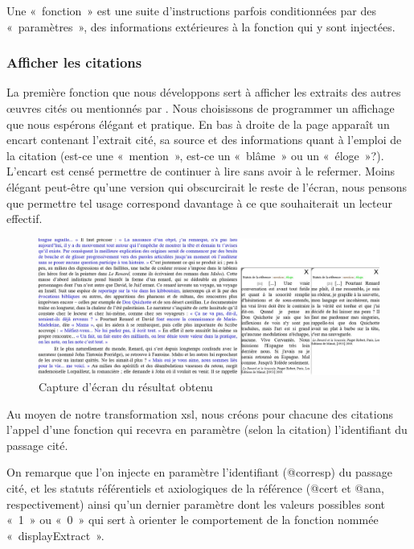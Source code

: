 \documentclass[12pt, a4paper]{article}
\begin{document}
Une «~fonction~» est une suite d'instructions parfois conditionnées par des «~paramètres~», des informations extérieures à la fonction qui y sont injectées.

\subsubsection{Afficher les citations}
\label{quote_dis}


La première fonction que nous développons sert à afficher les extraits des autres œuvres cités ou mentionnés par \robbe. Nous choisissons de programmer un affichage que nous espérons élégant et pratique. En bas à droite de la page apparaît un encart contenant l'extrait cité, sa source et des informations quant à l'emploi de la citation (est-ce une «~mention~», est-ce un «~blâme~» ou un «~éloge~»?). L'encart est censé permettre de continuer à lire \punr{} sans avoir à le refermer. Moins élégant peut-être qu'une version qui obscurcirait le reste de l'écran, nous pensons que permettre tel usage correspond davantage à ce que souhaiterait un lecteur effectif.
\begin{figure}[H]
    \centering
    \includegraphics[scale=0.5]{img/screen_quote_result.jpg}
    \caption{Capture d'écran du résultat obtenu}
    \label{fig:quote}
\end{figure}


Au moyen de notre transformation xsl, nous créons pour chacune des citations l'appel d'une fonction qui recevra en paramètre (selon la citation) l'identifiant du passage cité.


On remarque que l'on injecte en paramètre l'identifiant (@corresp) du passage cité, et les statuts référentiels et axiologiques de la référence (@cert et @ana, respectivement) ainsi qu'un dernier paramètre dont les valeurs possibles sont «~1~» ou «~0~» qui sert à orienter le comportement de la fonction nommée «~displayExtract~».
\end{document}
